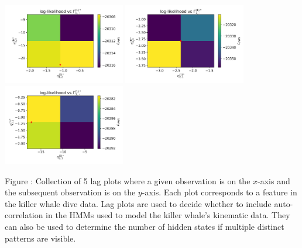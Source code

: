 \documentclass{article}
\begin{document}
        \begin{center}
        \includegraphics[width=2.1in]{../Plots/2019/20190902-182840-CATs_OB_1_0_267_CarHHMM2_fine-eta-likelihood-0-row_0.png}
        \includegraphics[width=2.1in]{../Plots/2019/20190902-182840-CATs_OB_1_0_267_CarHHMM2_fine-eta-likelihood-0-row_1.png}
        \includegraphics[width=2.1in]{../Plots/2019/20190902-182840-CATs_OB_1_0_267_CarHHMM2_fine-eta-likelihood-0-row_2.png}
        \end{center}
        
        \noindent Figure : Collection of 5 lag plots where a given observation is on the $x$-axis and the subsequent observation is on the $y$-axis. Each plot corresponds to a feature in the killer whale dive data. Lag plots are used to decide whether to include auto-correlation in the HMMs used to model the killer whale's kinematic data. They can also be used to determine the number of hidden states if multiple distinct patterns are visible. 
        \addtocounter{fignum}{1}
        
\end{document}
